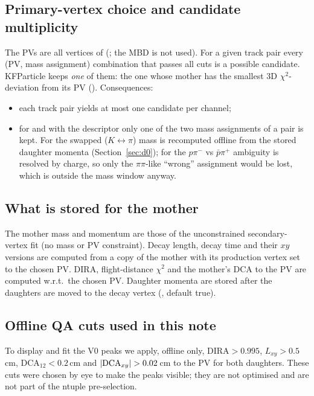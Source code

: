 \subsection{Primary-vertex choice and candidate multiplicity}
The PVs are all vertices of  (; the MBD is not
used). For a given track pair every (PV, mass assignment) combination that passes all cuts is a
possible candidate. KFParticle keeps \emph{one} of them: the one whose mother has the smallest 3D
$\chi^2$-deviation from its PV (). Consequences:
\begin{itemize}\setlength\itemsep{0pt}
\item each track pair yields at most one candidate per channel;
\item for \Lam{} and \Dzero{} with the  descriptor only one of the two mass
  assignments of a pair is kept. For \Dzero{} the swapped ($K\leftrightarrow\pi$) mass is
  recomputed offline from the stored daughter momenta (Section~\ref{sec:d0}); for \Lam{} the
  $p\pi^-$ vs $\bar p\pi^+$ ambiguity is resolved by charge, so only the $\pi\pi$-like
  ``wrong'' assignment would be lost, which is outside the mass window anyway.
\end{itemize}

\subsection{What is stored for the mother}
The mother mass and momentum are those of the unconstrained secondary-vertex fit (no mass or PV
constraint). Decay length, decay time and their $xy$ versions are computed from a copy of the
mother with its production vertex set to the chosen PV. DIRA, flight-distance $\chi^2$ and the
mother's DCA to the PV are computed w.r.t.\ the chosen PV. Daughter momenta are stored after the
daughters are moved to the decay vertex (, default true).

\subsection{Offline QA cuts used in this note}
\label{sec:qacuts}
To display and fit the V0 peaks we apply, offline only, DIRA$>0.995$, $L_{xy}>0.5$\,cm,
DCA$_{12}<0.2$\,cm and $|{\rm DCA}_{xy}|>0.02$\,cm to the PV for both daughters. These cuts were
chosen by eye to make the peaks visible; they are not optimised and are not part of the
ntuple pre-selection.
